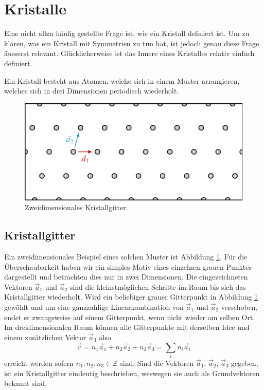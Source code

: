 \section{Kristalle}
%
Eine nicht allzu häufig gestellte Frage ist, wie ein Kristall definiert ist.
Um zu klären, was ein Kristall mit Symmetrien zu tun hat, ist jedoch genau diese Frage äusserst relevant. 
Glücklicherweise ist das Innere eines Kristalles relativ einfach definiert.
\begin{definition}[Kristall]
    Ein Kristall besteht aus Atomen, welche sich in einem Muster arrangieren, welches sich in drei Dimensionen periodisch wiederholt.
%
\end{definition}

\begin{figure}
    \centering
    \includegraphics[]{papers/punktgruppen/figures/lattice}
    \caption{
        Zweidimensionales Kristallgitter.
        \label{fig:punktgruppen:lattice}
    }
\end{figure}
\subsection{Kristallgitter}
%
Ein zweidimensionales Beispiel eines solchen Muster ist Abbildung \ref{fig:punktgruppen:lattice}.
Für die Überschaubarkeit haben wir ein simples Motiv eines einzelnen grauen Punktes dargestellt und betrachten dies nur in zwei Dimensionen.
Die eingezeichneten Vektoren \(\vec{a}_1\) und \(\vec{a}_2\) sind die kleinstmöglichen Schritte im Raum bis sich das Kristallgitter wiederholt.
Wird ein beliebiger grauer Gitterpunkt in Abbildung \ref{fig:punktgruppen:lattice} gewählt und um eine ganzzahlige Linearkombination von \(\vec{a}_1\) und \(\vec{a}_2\) verschoben, endet er zwangsweise auf einem Gitterpunkt, wenn nicht wieder am selben Ort.
%
Im dreidimensionalen Raum können alle Gitterpunkte mit derselben Idee und einem zusätzlichen Vektor \(\vec{a}_3\) also
\[
  \vec{r} = n_1 \vec{a}_1 + n_2 \vec{a}_2 + n_3 \vec{a}_3 = \sum_i n_i \vec{a}_i
\]
erreicht werden sofern \(n_1,n_2,n_3 \in \mathbb{Z}\) sind.
Sind die Vektoren  \(\vec{a}_1\), \(\vec{a}_2\), \(\vec{a}_3\) gegeben, ist ein Kristallgitter eindeutig beschrieben, weswegen sie auch als Grundvektoren bekannt sind.
%

